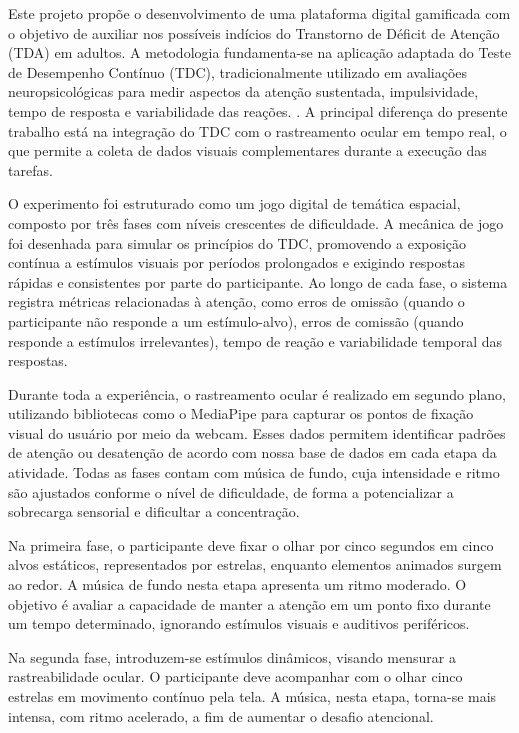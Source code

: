 Este projeto propõe o desenvolvimento de uma plataforma digital gamificada com o objetivo
de auxiliar nos possíveis indícios do Transtorno de Déficit de Atenção (TDA) em adultos. A
metodologia fundamenta-se na aplicação adaptada do Teste de Desempenho Contínuo
(TDC), tradicionalmente utilizado em avaliações neuropsicológicas para medir aspectos da
atenção sustentada, impulsividade, tempo de resposta e variabilidade das reações. \textcite{CPT2025}. A
principal diferença do presente trabalho está na integração do TDC com o rastreamento
ocular em tempo real, o que permite a coleta de dados visuais complementares durante a
execução das tarefas.

O experimento foi estruturado como um jogo digital de temática espacial, composto por três
fases com níveis crescentes de dificuldade. A mecânica de jogo foi desenhada para simular
os princípios do TDC, promovendo a exposição contínua a estímulos visuais por períodos
prolongados e exigindo respostas rápidas e consistentes por parte do participante. Ao longo
de cada fase, o sistema registra métricas relacionadas à atenção, como erros de omissão
(quando o participante não responde a um estímulo-alvo), erros de comissão (quando
responde a estímulos irrelevantes), tempo de reação e variabilidade temporal das respostas.

Durante toda a experiência, o rastreamento ocular é realizado em segundo plano, utilizando
bibliotecas como o MediaPipe para capturar os pontos de fixação visual do usuário por meio
da webcam. Esses dados permitem identificar padrões de atenção ou desatenção de acordo
com nossa base de dados em cada etapa da atividade. Todas as fases contam com música
de fundo, cuja intensidade e ritmo são ajustados conforme o nível de dificuldade, de forma a
potencializar a sobrecarga sensorial e dificultar a concentração.

Na primeira fase, o participante deve fixar o olhar por cinco segundos em cinco alvos
estáticos, representados por estrelas, enquanto elementos animados surgem ao redor. A
música de fundo nesta etapa apresenta um ritmo moderado. O objetivo é avaliar a
capacidade de manter a atenção em um ponto fixo durante um tempo determinado,
ignorando estímulos visuais e auditivos periféricos.

Na segunda fase, introduzem-se estímulos dinâmicos, visando mensurar a rastreabilidade
ocular. O participante deve acompanhar com o olhar cinco estrelas em movimento contínuo
pela tela. A música, nesta etapa, torna-se mais intensa, com ritmo acelerado, a fim de
aumentar o desafio atencional.

